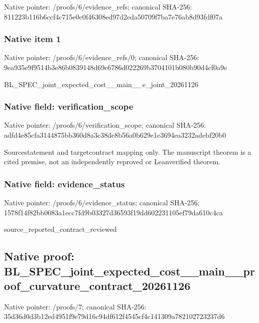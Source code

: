 \documentclass[10pt,a4paper]{article}
\begin{document}
Native pointer: /proofs/6/evidence\_refs; canonical SHA-256: 811223b116b6ccf4c715e0c0\allowbreak{}f46308ed97d2eda50709f7ba\allowbreak{}7e76ab8d93fdf07a



\subsubsection{Native item 1}


Native pointer: /proofs/6/evidence\_refs/0; canonical SHA-256: 9ea935e9f9514b3e86b08391\allowbreak{}48d69e6786d022269b370410\allowbreak{}1b080b90d4cf0a9e


BL\_SPEC\_joint\_expected\_c\allowbreak{}ost\_\_main\_\_e\_joint\_20261\allowbreak{}126


\subsubsection{Native field: verification\_scope}


Native pointer: /proofs/6/verification\_scope; canonical SHA-256: adfd4e85cfa3144875bb360d\allowbreak{}8a3c38de8b56a0b629e1e369\allowbreak{}4ea3232adebf20b0


Sourcestatement and targetcontract mapping only. The manuscript theorem is a cited premise, not an independently reproved or Leanverified theorem.


\subsubsection{Native field: evidence\_status}


Native pointer: /proofs/6/evidence\_status; canonical SHA-256: 1578f14f82bb0083a1ecc7fd\allowbreak{}9b03327d36593f19dd602231\allowbreak{}105ef79da610c4ca


source\_reported\_contract\_reviewed


\subsection{Native proof: BL\_SPEC\_joint\_expected\_c\allowbreak{}ost\_\_main\_\_proof\_curvatu\allowbreak{}re\_contract\_20261126}


Native pointer: /proofs/7; canonical SHA-256: 35d36d0d3b12ed4951f9e79d\allowbreak{}16c94df612f4545cf4c14130\allowbreak{}9a782102723237d6
\end{document}
